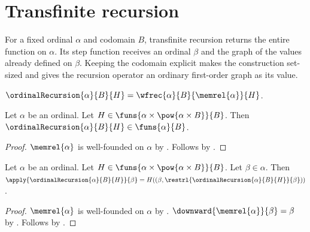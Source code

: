 


\section{Transfinite recursion}

For a fixed ordinal $\alpha$ and codomain $B$, transfinite recursion returns
the entire function on $\alpha$.  Its step function receives an ordinal
$\beta$ and the graph of the values already defined on $\beta$.  Keeping the
codomain explicit makes the construction set-sized and gives the recursion
operator an ordinary first-order graph as its value.

\begin{definition}\label{ordinal_recursion}
    $\ordinalRecursion{\alpha}{B}{H}=
        \wfrec{\alpha}{B}{\memrel{\alpha}}{H}$.
\end{definition}

\begin{theorem}\label{ordinal_recursion_type}
    Let $\alpha$ be an ordinal.
    Let $H\in\funs{\alpha\times\pow{\alpha\times B}}{B}$.
    Then $\ordinalRecursion{\alpha}{B}{H}\in\funs{\alpha}{B}$.
\end{theorem}
\begin{proof}
    $\memrel{\alpha}$ is well-founded on $\alpha$
        by .
    Follows by
        .
\end{proof}

\begin{theorem}\label{ordinal_recursion_equation}
    Let $\alpha$ be an ordinal.
    Let $H\in\funs{\alpha\times\pow{\alpha\times B}}{B}$.
    Let $\beta\in\alpha$.
    Then
        $\apply{\ordinalRecursion{\alpha}{B}{H}}{\beta}=
            H((\beta,\restrl{\ordinalRecursion{\alpha}{B}{H}}{\beta}))$.
\end{theorem}
\begin{proof}
    $\memrel{\alpha}$ is well-founded on $\alpha$
        by .
    $\downward{\memrel{\alpha}}{\beta}=\beta$
        by .
    Follows by
        .
\end{proof}

